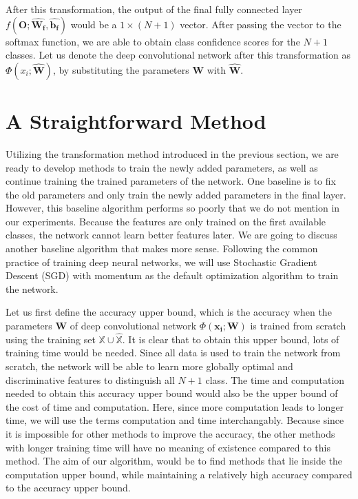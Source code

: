 After this transformation, the output of the final fully connected layer $f(\mathbf{O}; \hat{\mathbf{W_f}}, \hat{\mathbf{b_f}})$ would be a $1\times (N+1)$ vector. After passing the vector to the softmax function, we are able to obtain class confidence scores for the $N+1$ classes. Let us denote the deep convolutional network after this transformation as $\Phi(x_i; \hat{\mathbf{W}})$, by substituting the parameters $\mathbf{W}$ with $\hat{\mathbf{W}}$.


\section{A Straightforward Method}

Utilizing the transformation method introduced in the previous section, we are ready to develop methods to train the newly added parameters, as well as continue training the trained parameters of the network. One baseline is to fix the old parameters and only train the newly added parameters in the final layer. However, this baseline algorithm performs so poorly that we do not mention in our experiments. Because the features are only trained on the first available classes, the network cannot learn better features later. We are going to discuss another baseline algorithm that makes more sense. Following the common practice of training deep neural networks, we will use Stochastic Gradient Descent\cite{he2016deep} (SGD) with momentum\cite{sutskever2013importance} as the default optimization algorithm to train the network. 

Let us first define the accuracy upper bound, which is the accuracy when the parameters $\mathbf{W}$ of deep convolutional network $\Phi(\mathbf{x_i}; \mathbf{W})$ is trained from scratch using the training set $\mathbb{X}\cup \hat{\mathbb{X}}$. It is clear that to obtain this upper bound, lots of training time would be needed. Since all data is used to train the network from scratch, the network will be able to learn more globally optimal and discriminative features to distinguish all $N+1$ class. The time and computation needed to obtain this accuracy upper bound would also be the upper bound of the cost of time and computation. Here, since more computation leads to longer time, we will use the terms computation and time interchangably. Because since it is impossible for other methods to improve the accuracy, the other methods with longer training time will have no meaning of existence compared to this method. The aim of our algorithm, would be to find methods that lie inside the computation upper bound, while maintaining a relatively high accuracy compared to the accuracy upper bound.

